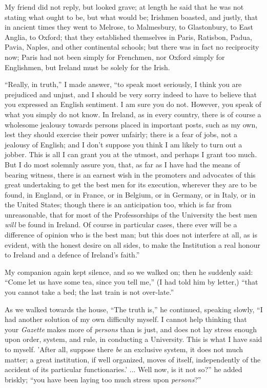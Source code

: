 My friend did not reply, but looked grave; at length he said that
he was not stating what ought to be, but what would be; Irishmen
boasted, and justly, that in ancient times they went to Melrose, to
Malmesbury, to Glastonbury, to East Anglia, to Oxford; that they
established themselves in Paris, Ratisbon, Padua, Pavia, Naples, and
other continental schools; but there was in fact no reciprocity now;
Paris had not been simply for Frenchmen, nor Oxford simply for
Englishmen, but Ireland must be solely for the Irish.

``Really, in truth,'' I made answer, ``to speak most
seriously, I think you are prejudiced and unjust, and I should be very
sorry indeed to have to believe that you expressed an English
sentiment. I am sure you do not. However, you speak of what you simply
do not know. In Ireland, as in every country, there is of course a
wholesome jealousy towards persons placed in important posts, such as
my own, lest they should exercise their power unfairly; there is a
fear of jobs, not a jealousy of English; and I don't suppose you think
I am likely to turn out a jobber. This is all I can grant you at the
utmost, and perhaps I grant too much. But I do most solemnly assure
you, that, as far as I have had the means of bearing witness, there is
an earnest wish in the promoters and advocates of this great
undertaking to get the best men for its execution, wherever they are
to be found, in England, or in France, or in Belgium, or in Germany,
or in Italy, or in the United States; though there is an anticipation
too, which is far from unreasonable, that for most of the
Professorships of the University the best men \emph{will} be found in
Ireland. Of course in particular cases, there ever will be a
difference of opinion who is the best man; but this does not
interfere at all, as is evident, with the honest desire on all sides,
to make the Institution a real honour to Ireland and a defence of
Ireland's faith.''

My companion again kept silence, and so we walked on; then he
suddenly said: ``Come let us have some tea, since you tell
me,'' (I had told him by letter,) ``that you cannot take a
bed; the last train is not over-late.''

As we walked towards the house, ``The truth is,'' he
continued, speaking slowly, ``I had another solution of my own
difficulty myself. I cannot help thinking that your \emph{Gazette}
makes more of \emph{persons} than is just, and does not lay stress
enough upon order, system, and rule, in conducting a University. This
is what I have said to myself. 'After all, suppose there \emph{be} an
exclusive system, it does not much matter; a great institution, if
well organized, moves of itself, independently of the accident of its
particular functionaries.' ... Well now, is it not so?'' he added
briskly; ``you have been laying too much stress upon \emph{persons}?''

